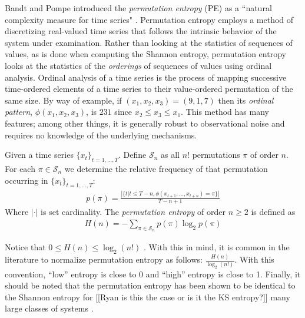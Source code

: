 Bandt and Pompe introduced the \emph{permutation entropy} (PE) as a ``natural
complexity measure for time series" \cite{bandt2002per}.  Permutation entropy
employs a method of discretizing real-valued time series that follows the
intrinsic behavior of the system under examination.  Rather than looking at the
statistics of sequences of values, as is done when computing the Shannon
entropy, permutation entropy looks at the statistics of the \emph{orderings} of
sequences of values using ordinal analysis. Ordinal analysis of a time series is
the process of mapping successive time-ordered elements of a time series to
their value-ordered permutation of the same size.  By way of example, if $(x_1,
x_2, x_3) = (9, 1, 7)$ then its \emph{ordinal pattern}, $\phi(x_1, x_2, x_3)$,
is $231$ since $x_2 \leq x_3 \leq x_1$.  This method has many features; among
other things, it is generally robust to observational noise and requires no
knowledge of the underlying mechanisms.

\begin{mydef}

  Given a time series $\{x_t\}_{t = 1,\dots,T}$. Define $\mathcal{S}_n$ as all
  $n!$ permutations $\pi$ of order $n$. For each $\pi \in \mathcal{S}_n$ we
  determine the relative frequency of that permutation occurring in $\{x_t\}_{t
  = 1,\dots,T}$:
  \begin{align*}
    p(\pi) = \frac{\left|\{t|t \leq T-n,\phi(x_{t+1},\dots,x_{t+n}) = \pi\}\right|}{T-n+1}
  \end{align*}
  Where $|\cdot|$ is set cardinality. The \emph{permutation entropy} of order $n
  \ge 2$ is defined as
  \begin{align*}
  H(n) = - \sum_{\pi \in \mathcal{S}_n} p(\pi) \log_2 p(\pi)
  \end{align*}

\end{mydef}

Notice that $0\le H(n) \le \log_2(n!)$ \cite{bandt2002per}.  With this in mind,
it is common in the literature to normalize permutation entropy as follows:
$\frac{H(n)}{\log_2(n!)}$.  With this convention, ``low'' entropy is close to 0
and ``high'' entropy is close to 1. Finally, it should be noted that the
permutation entropy has been shown to be identical to the Shannon entropy for {\color{red}[[Ryan is this the case or is it the KS entropy?]]}
many large classes of systems \cite{amigo2012permutation}.

